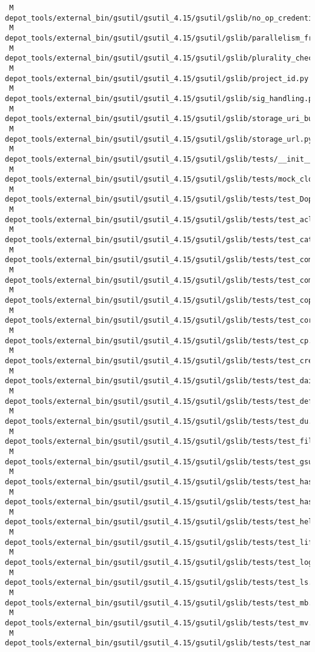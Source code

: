\documentclass{article}
\begin{document}
\begin{verbatim}
 M depot_tools/external_bin/gsutil/gsutil_4.15/gsutil/gslib/no_op_credentials.py
 M depot_tools/external_bin/gsutil/gsutil_4.15/gsutil/gslib/parallelism_framework_util.py
 M depot_tools/external_bin/gsutil/gsutil_4.15/gsutil/gslib/plurality_checkable_iterator.py
 M depot_tools/external_bin/gsutil/gsutil_4.15/gsutil/gslib/project_id.py
 M depot_tools/external_bin/gsutil/gsutil_4.15/gsutil/gslib/sig_handling.py
 M depot_tools/external_bin/gsutil/gsutil_4.15/gsutil/gslib/storage_uri_builder.py
 M depot_tools/external_bin/gsutil/gsutil_4.15/gsutil/gslib/storage_url.py
 M depot_tools/external_bin/gsutil/gsutil_4.15/gsutil/gslib/tests/__init__.py
 M depot_tools/external_bin/gsutil/gsutil_4.15/gsutil/gslib/tests/mock_cloud_api.py
 M depot_tools/external_bin/gsutil/gsutil_4.15/gsutil/gslib/tests/test_Doption.py
 M depot_tools/external_bin/gsutil/gsutil_4.15/gsutil/gslib/tests/test_acl.py
 M depot_tools/external_bin/gsutil/gsutil_4.15/gsutil/gslib/tests/test_cat.py
 M depot_tools/external_bin/gsutil/gsutil_4.15/gsutil/gslib/tests/test_command_runner.py
 M depot_tools/external_bin/gsutil/gsutil_4.15/gsutil/gslib/tests/test_compose.py
 M depot_tools/external_bin/gsutil/gsutil_4.15/gsutil/gslib/tests/test_copy_helper_funcs.py
 M depot_tools/external_bin/gsutil/gsutil_4.15/gsutil/gslib/tests/test_cors.py
 M depot_tools/external_bin/gsutil/gsutil_4.15/gsutil/gslib/tests/test_cp.py
 M depot_tools/external_bin/gsutil/gsutil_4.15/gsutil/gslib/tests/test_creds_config.py
 M depot_tools/external_bin/gsutil/gsutil_4.15/gsutil/gslib/tests/test_daisy_chain_wrapper.py
 M depot_tools/external_bin/gsutil/gsutil_4.15/gsutil/gslib/tests/test_defacl.py
 M depot_tools/external_bin/gsutil/gsutil_4.15/gsutil/gslib/tests/test_du.py
 M depot_tools/external_bin/gsutil/gsutil_4.15/gsutil/gslib/tests/test_file_part.py
 M depot_tools/external_bin/gsutil/gsutil_4.15/gsutil/gslib/tests/test_gsutil.py
 M depot_tools/external_bin/gsutil/gsutil_4.15/gsutil/gslib/tests/test_hash.py
 M depot_tools/external_bin/gsutil/gsutil_4.15/gsutil/gslib/tests/test_hashing_helper.py
 M depot_tools/external_bin/gsutil/gsutil_4.15/gsutil/gslib/tests/test_help.py
 M depot_tools/external_bin/gsutil/gsutil_4.15/gsutil/gslib/tests/test_lifecycle.py
 M depot_tools/external_bin/gsutil/gsutil_4.15/gsutil/gslib/tests/test_logging.py
 M depot_tools/external_bin/gsutil/gsutil_4.15/gsutil/gslib/tests/test_ls.py
 M depot_tools/external_bin/gsutil/gsutil_4.15/gsutil/gslib/tests/test_mb.py
 M depot_tools/external_bin/gsutil/gsutil_4.15/gsutil/gslib/tests/test_mv.py
 M depot_tools/external_bin/gsutil/gsutil_4.15/gsutil/gslib/tests/test_naming.py

\end{verbatim}
\end{document}
